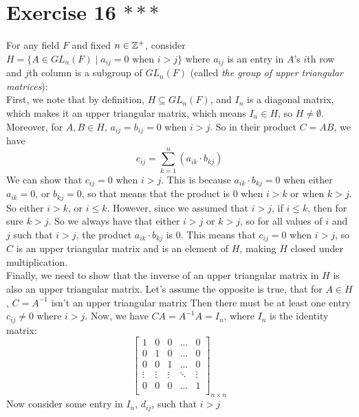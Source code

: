 \documentclass[12pt]{article}
\begin{document}
    \section*{Exercise 16 $***$}
    For any field $F$ and fixed $n \in \mathbb{Z}^+$,
    consider $H = \{ A \in GL_n(F) \mid a_{ij} = 0 \text{ when } i > j\}$
    where $a_{ij}$ is an entry in $A$'s $i$th row and $j$th column
    is a subgroup of $GL_n(F)$
    (called \textit{ the group of upper triangular matrices}): \\
    First, we note that by definition, $H \subseteq GL_n(F)$,
    and $I_n$ is a diagonal matrix,
    which makes it an upper triangular matrix,
    which means $I_n \in H$,
    so $H \neq \emptyset$. \\ 
    Moreover, for $A, B \in H$, $a_{ij} = b_{ij} = 0$ when $i > j$.
    So in their product $C = AB$, we have 
    \[ c_{ij} = \sum_{k = 1}^n (a_{ik} \cdot b_{kj}) \]
    We can show that $c_{ij} = 0$ when $i > j$.
    This is because $a_{ik} \cdot b_{kj} = 0$
    when either $a_{ik} = 0$, or $b_{kj} = 0$,
    so that means that the product is 0 when $i > k$
    or when $k > j$.
    So either $i > k$, or $i \leqslant k$.
    However, since we assumed that $i > j$,
    if $i \leqslant k$, then for sure $k > j$.
    So we always have that either $i > j$ or $k > j$,
    so for all values of $i$ and $j$ such that $i > j$,
    the product $a_{ik} \cdot b_{kj}$ is 0.
    This means that $c_{ij} = 0$ when $i > j$,
    so $C$ is an upper triangular matrix and is an element of $H$,
    making $H$ closed under multiplication. \\ 
    Finally, we need to show that the inverse of an upper triangular
    matrix in $H$ is also an upper triangular matrix.
    Let's assume the opposite is true, that for $A \in H$,
    $C = A^{-1}$ isn't an upper triangular matrix
    Then there must be at least one entry $c_{ij} \neq 0$
    where $i > j$.
    Now, we have $CA = A^{-1}A = I_n$,
    where $I_n$ is the identity matrix:
    \[ \begin{bmatrix}
        1 & 0 & 0 & \dots & 0 \\
        0 & 1 & 0 & \dots & 0 \\
        0 & 0 & 1 & \dots & 0 \\
        \vdots & \vdots & \vdots & \ddots & \vdots \\
        0 & 0 & 0 & \dots & 1 \\
    \end{bmatrix}_{n \times n} \]
    Now consider some entry in $I_n$, $d_{ij}$, such that $i > j$
\end{document}
